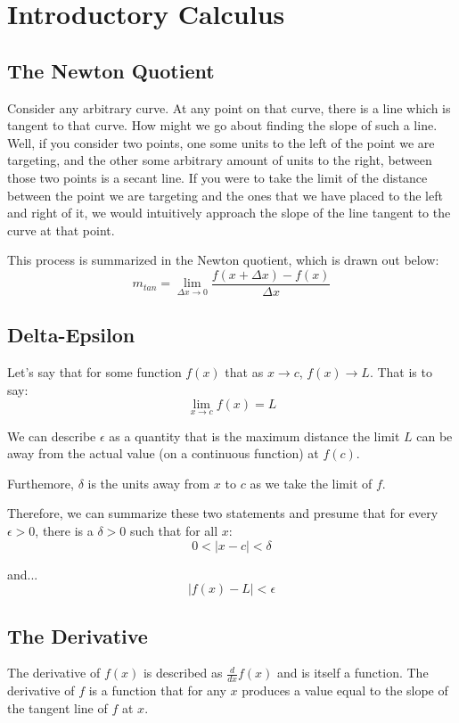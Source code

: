 \chapter{Introductory Calculus}
\section{The Newton Quotient}
Consider any arbitrary curve.  At any point on that curve, there is a line which
is tangent to that curve.  How might we go about finding the slope of such a
line.  Well, if you consider two points, one some units to the left of the
point we are targeting, and the other some arbitrary amount of units to the
right, between those two points is a secant line.  If you were to take the limit
of the distance between the point we are targeting and the ones that we have
placed to the left and right of it, we would intuitively approach the slope of
the line tangent to the curve at that point.

This process is summarized in the Newton quotient, which is drawn out below:
\begin{equation}
m_{tan}=\lim_{\Delta x\to 0} \frac{f(x+\Delta x)-f(x)}{\Delta x}
\end{equation}

\section{Delta-Epsilon}
Let's say that for some function $f(x)$ that as $x\to c$, $f(x)\to L$.  That is
to say:
\begin{equation}
\lim_{x \to c} f(x) = L
\end{equation}

We can describe $\epsilon$ as a quantity that is the maximum distance the limit
$L$ can be away from the actual value (on a continuous function) at $f(c)$.

Furthemore, $\delta$ is the units away from $x$ to $c$ as we take the limit of
$f$.

Therefore, we can summarize these two statements and presume that for every
$\epsilon > 0$, there is a $\delta > 0$ such that for all $x$:
\begin{equation}
0 \lt |x-c| < \delta
\end{equation}

and...
\begin{equation}
|f(x)-L| < \epsilon
\end{equation}

\section{The Derivative}
The derivative of $f(x)$ is described as $\frac{d}{dx}f(x)$ and is itself a
function.  The derivative of $f$ is a function that for any $x$ produces a value
equal to the slope of the tangent line of $f$ at $x$.

